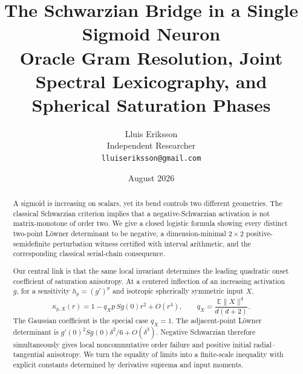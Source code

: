 \documentclass[11pt]{article}
\title{\bfseries The Schwarzian Bridge in a Single Sigmoid Neuron\\
\large Oracle Gram Resolution, Joint Spectral Lexicography, and Spherical Saturation Phases}
\author{Lluis Eriksson\\Independent Researcher\\\texttt{lluiseriksson@gmail.com}}
\date{August 2026}
\newcommand{\E}{\mathbb E}
\begin{document}
\maketitle

\begin{abstract}
A sigmoid is increasing on scalars, yet its bend controls two different geometries.  The classical Schwarzian
criterion implies that a negative-Schwarzian activation is not matrix-monotone of order two.  We give a closed
logistic formula showing every distinct two-point L\"owner determinant to be negative, a dimension-minimal
$2\times2$ positive-semidefinite perturbation witness certified with interval arithmetic, and the corresponding
classical serial-chain consequence.

Our central link is that the same local invariant determines the leading quadratic onset coefficient of saturation
anisotropy.  At a centered inflection of an increasing activation $g$, for a sensitivity $h_p=(g')^p$ and
isotropic spherically symmetric input $X$,
\[
 \kappa_{p,X}(r)=1-q_Xp\,Sg(0)r^2+O(r^4),\qquad
 q_X=\frac{\E\lVert X\rVert^4}{d(d+2)}.
\]
The Gaussian coefficient is the special case $q_X=1$.  The adjacent-point L\"owner determinant is
$g'(0)^2Sg(0)\delta^2/6+O(\delta^3)$.  Negative Schwarzian therefore simultaneously gives local
noncommutative order failure and positive initial radial--tangential anisotropy.  We turn the equality of limits
into a finite-scale inequality with explicit constants determined by derivative suprema and input moments.


\end{abstract}
\end{document}
